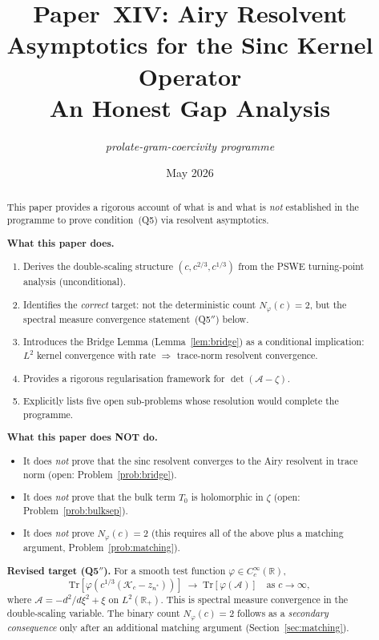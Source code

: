 \documentclass[12pt,a4paper]{amsart}
\theoremstyle{definition}
\theoremstyle{remark}
\newcommand{\Kc}{\mathcal{K}_c}
\newcommand{\Tr}{\mathrm{Tr}}
\newcommand{\cA}{\mathcal{A}}
\newcommand{\R}{\mathbb{R}}
\begin{document}
\title[Paper XIV: Airy Resolvent for Sinc Kernel]{%
 Paper~XIV: Airy Resolvent Asymptotics for the Sinc Kernel Operator\\[0.3em]
 \large An Honest Gap Analysis}

\author{\textit{prolate-gram-coercivity programme}}
\date{May 2026}

\begin{abstract}
This paper provides a rigorous account of what is and what is \emph{not}
established in the programme to prove condition~(Q5) via resolvent
asymptotics.

\medskip\noindent
\textbf{What this paper does.}
\begin{enumerate}[nosep]
 \item Derives the double-scaling structure $(c, c^{2/3}, c^{1/3})$
 from the PSWE turning-point analysis (unconditional).
 \item Identifies the \emph{correct} target: not the deterministic
 count $N_\varphi(c)=2$, but the spectral measure
 convergence statement~(Q5$''$) below.
 \item Introduces the Bridge Lemma (Lemma~\ref{lem:bridge})
 as a conditional implication: $L^2$ kernel convergence with rate
 $\Rightarrow$ trace-norm resolvent convergence.
 \item Provides a rigorous regularisation framework for $\det(\cA-\zeta)$.
 \item Explicitly lists five open sub-problems whose resolution
 would complete the programme.
\end{enumerate}

\medskip\noindent
\textbf{What this paper does NOT do.}
\begin{itemize}[nosep]
 \item It does \emph{not} prove that the sinc resolvent converges
 to the Airy resolvent in trace norm (open: Problem~\ref{prob:bridge}).
 \item It does \emph{not} prove that the bulk term $T_0$ is holomorphic
 in $\zeta$ (open: Problem~\ref{prob:bulksep}).
 \item It does \emph{not} prove $N_\varphi(c)=2$ (this requires all of
 the above plus a matching argument, Problem~\ref{prob:matching}).
\end{itemize}

\medskip\noindent
\textbf{Revised target (Q5$''$).}
For a smooth test function $\varphi \in C_c^\infty(\R)$,
\begin{equation*}
 \Tr[\varphi(c^{1/3}(\Kc - z_{n^*}))] \;\longrightarrow\;
 \Tr[\varphi(\cA)] \quad \text{as } c\to\infty,
\end{equation*}
where $\cA = -d^2/d\xi^2 + \xi$ on $L^2(\R_+)$.
This is spectral measure convergence in the double-scaling variable.
The binary count $N_\varphi(c)=2$ follows as a \emph{secondary consequence}
only after an additional matching argument (Section~\ref{sec:matching}).
\end{abstract}
\end{document}
